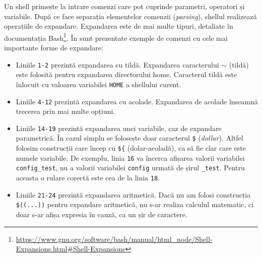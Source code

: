 Un shell primește la intrare comenzi care pot cuprinde parametri, operatori și variabile. După ce face separația elementelor comenzii (\textit{parsing}), shellul realizează operațiile de expandare. Expandarea este de mai
multe tipuri, detaliate în documentația Bash\footnote{\url{https://www.gnu.org/software/bash/manual/html\_node/Shell-Expansions.html\#Shell-Expansions}}. În  sunt prezentate exemple de comenzi cu cele mai
importante forme de expandare:
\begin{itemize}
  \item Liniile \texttt{1-2} prezintă expandarea cu tildă. Expandarea caracterului \texttt{$\sim$} (tildă) este folosită pentru expandarea directorului home. Caracterul tildă este înlocuit cu valoarea variabilei \texttt{HOME} a shellului curent.
  \item Liniile \texttt{4-12} prezintă expandarea cu acolade.
Expandarea de acolade înseamnă trecerea prin mai multe opțiuni.
  \item Liniile \texttt{14-19} prezintă expandarea unei variabile, caz de expandare parametrică. În cazul simplu se folosește doar caracterul \texttt{\$} (\textit{dollar}). Altfel folosim construcții care încep cu \texttt{\$\{} (dolar-acoladă), ca să fie clar care este numele variabile.
    De exemplu, linia \texttt{16} va încerca afișarea valorii variabilei \texttt{config\_test}, nu a valorii variabilei \texttt{config} urmată de
    șirul \texttt{\_test}. Pentru aceasta o rulare corectă este cea de la linia \texttt{18}.
  \item Liniile \texttt{21-24} prezintă expandarea aritmetică. Dacă nu am folosi construcția \verb|$((...))| pentru expandare aritmetică, nu s-ar realiza calculul matematic, ci doar s-ar afișa expresia în cauză, ca un șir de caractere.
\end{itemize}


